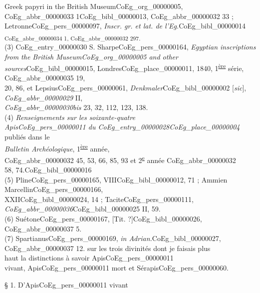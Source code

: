 \documentclass{book}
\begin{document}
{\begin{paracol}{2}
{Greek papyri in the British Museum\gls{CoEg_org_00000005}},\\
\gls{CoEg_abbr_00000033} 1\gls{CoEg_bibl_00000013}, \gls{CoEg_abbr_00000032} 33 ; Letronne\gls{CoEg_pers_00000097}, \textit{Inscr. gr. et lat. de l’Eg.}\gls{CoEg_bibl_00000014} \textsubscript{\gls{CoEg_abbr_00000034} 1, \gls{CoEg_abbr_00000032} 297.}\\
(3) \Gls{CoEg_entry_00000030} S. Sharpe\gls{CoEg_pers_00000164}, \textit{Egyptian inscriptions\\
from the British Museum\gls{CoEg_org_00000005} and other\\
sources}\gls{CoEg_bibl_00000015}, Londres\gls{CoEg_place_00000011}, 1840, 1\textsuperscript{\underline{ère}} série, \gls{CoEg_abbr_00000035} 19,\\
20, 86, et Lepsius\gls{CoEg_pers_00000061}, \textit{Denkmaler}\gls{CoEg_bibl_00000002} [\textit{sic}], \textit{\gls{CoEg_abbr_00000029}} II,\\
\textit{\gls{CoEg_abbr_00000030bis}} 23, 32, 112, 123, 138.\\
(4) \textit{Renseignements sur les soixante-quatre\\
Apis\gls{CoEg_pers_00000011} du \Gls{CoEg_entry_00000028}\gls{CoEg_place_00000004}} publiés dans le\\
\textit{Bulletin Archéologique}, 1\textsuperscript{\underline{ère}} année,\\
\gls{CoEg_abbr_00000032} 45, 53, 66, 85, 93 et 2\textsuperscript{\underline{e}} année \gls{CoEg_abbr_00000032}\\
58, 74.\gls{CoEg_bibl_00000016}\\
(5) Pline\gls{CoEg_pers_00000165}, VIII\gls{CoEg_bibl_00000012}, 71 ; Ammien Marcellin\gls{CoEg_pers_00000166},\\
XXII\gls{CoEg_bibl_00000024}, 14 ; Tacite\gls{CoEg_pers_00000111}, \textit{\gls{CoEg_abbr_00000036}}\gls{CoEg_bibl_00000025} II, 59.\\
(6) Suétone\gls{CoEg_pers_00000167}, [Tit. ?]\gls{CoEg_bibl_00000026}, \gls{CoEg_abbr_00000037} 5.\\
(7) Spartianus\gls{CoEg_pers_00000169}, \textit{in Adrian.}\gls{CoEg_bibl_00000027}, \gls{CoEg_abbr_00000037} 12.
\switchcolumn
\noindent sur les trois divinités dont je faisais plus\\
haut la distinctions à savoir Apis\gls{CoEg_pers_00000011}\\
vivant, Apis\gls{CoEg_pers_00000011} mort et Sérapis\gls{CoEg_pers_00000060}.
\begin{center}§ 1. D’Apis\gls{CoEg_pers_00000011} vivant\end{center}

\end{paracol}}
\end{document}

